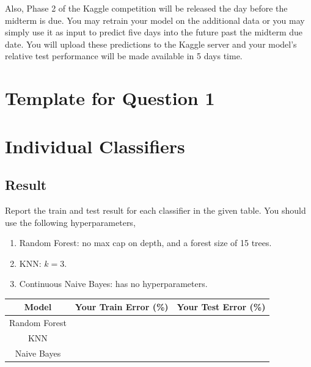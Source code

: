Also, Phase 2 of the Kaggle competition will be released the day before the midterm is due.  You may retrain your model on the additional data or you may simply use it as input to predict five days into the future past the midterm due date.  You will upload these predictions to the Kaggle server and your model's relative test performance will be made available in 5 days time. 



\newpage
%
%
\section*{Template for Question 1}

\setcounter{section}{0}


\section{Individual Classifiers}

\subsection{Result}

Report the train and test result for each classifier in the given table. You should use the following hyperparameters,
\begin{enumerate}
    \item Random Forest: no max cap on depth, and a forest size of 15 trees.
    \item KNN: $k=3$.
    \item Continuous Naive Bayes: has no hyperparameters.\\
\end{enumerate}

\begin{center}
 \begin{tabular}{|c | c | c|} 
 \hline
 Model & Your Train Error (\%) & Your Test Error (\%) \\ [0.5ex]
 \hline\hline
 Random Forest & & \\
 KNN & & \\
 Naive Bayes &  & \\
 
 \hline
\end{tabular}\\~\\~\\
\end{center}

